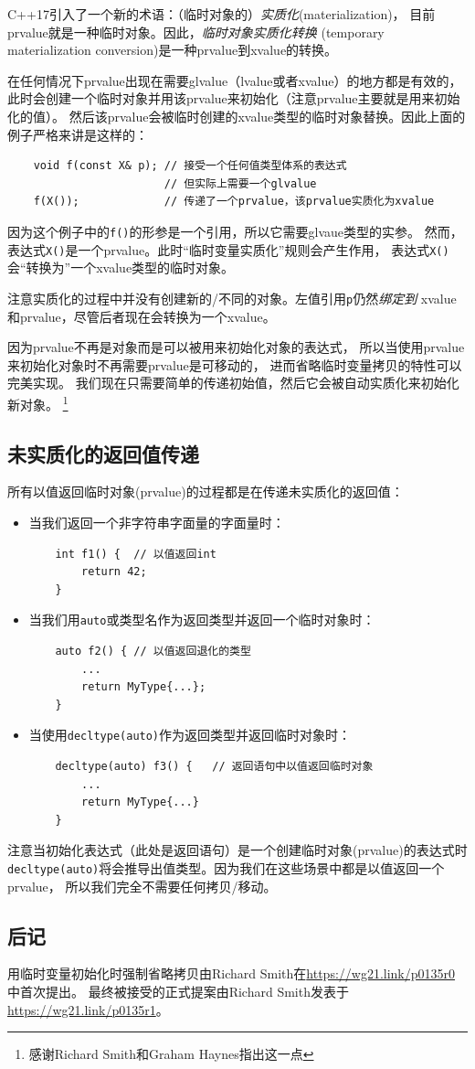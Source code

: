 C++17引入了一个新的术语：（临时对象的）\emph{实质化}(materialization)，
目前prvalue就是一种临时对象。因此，\emph{临时对象实质化转换}
(temporary materialization conversion)是一种prvalue到xvalue的转换。

在任何情况下prvalue出现在需要glvalue（lvalue或者xvalue）的地方都是有效的，
此时会创建一个临时对象并用该prvalue来初始化（注意prvalue主要就是用来初始化的值）。
然后该prvalue会被临时创建的xvalue类型的临时对象替换。因此上面的例子严格来讲是这样的：
\begin{lstlisting}
    void f(const X& p); // 接受一个任何值类型体系的表达式
                        // 但实际上需要一个glvalue
    f(X());             // 传递了一个prvalue，该prvalue实质化为xvalue
\end{lstlisting}
因为这个例子中的\texttt{f()}的形参是一个引用，所以它需要glvaue类型的实参。
然而，表达式\texttt{X()}是一个prvalue。此时“临时变量实质化”规则会产生作用，
表达式\texttt{X()}会“转换为”一个xvalue类型的临时对象。

注意实质化的过程中并没有创建新的/不同的对象。左值引用\texttt{p}仍然\emph{绑定到}
xvalue和prvalue，尽管后者现在会转换为一个xvalue。

因为prvalue不再是对象而是可以被用来初始化对象的表达式，
所以当使用prvalue来初始化对象时不再需要prvalue是可移动的，
进而省略临时变量拷贝的特性可以完美实现。
我们现在只需要简单的传递初始值，然后它会被自动实质化来初始化新对象。
\footnote{感谢Richard Smith和Graham Haynes指出这一点}

\subsection{未实质化的返回值传递}
所有以值返回临时对象(prvalue)的过程都是在传递未实质化的返回值：
\begin{itemize}[leftmargin=*]
    \item 当我们返回一个非字符串字面量的字面量时：
    \begin{lstlisting}
    int f1() {  // 以值返回int
        return 42;
    }
    \end{lstlisting}
    \item 当我们用\texttt{auto}或类型名作为返回类型并返回一个临时对象时：
    \begin{lstlisting}
    auto f2() { // 以值返回退化的类型
        ...
        return MyType{...};
    }
    \end{lstlisting}
    \item 当使用\texttt{decltype(auto)}作为返回类型并返回临时对象时：
    \begin{lstlisting}
    decltype(auto) f3() {   // 返回语句中以值返回临时对象
        ...
        return MyType{...}
    }
    \end{lstlisting}
\end{itemize}

注意当初始化表达式（此处是返回语句）是一个创建临时对象(prvalue)的表达式时
\texttt{decltype(auto)}将会推导出值类型。因为我们在这些场景中都是以值返回一个prvalue，
所以我们完全不需要任何拷贝/移动。

\subsection{后记}
用临时变量初始化时强制省略拷贝由Richard Smith在\url{https://wg21.link/p0135r0}中首次提出。
最终被接受的正式提案由Richard Smith发表于\url{https://wg21.link/p0135r1}。
